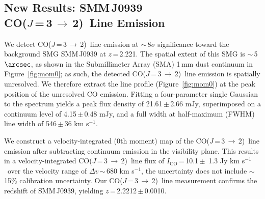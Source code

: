 \documentclass[twocolumn,apj,numberedappendix]{emulateapj}
\newcommand{\CO}{\mbox{CO($J$\,=\,3\,$\rightarrow$\,2) }}
\newcommand{\pmOne}{\mbox{$^{-1}$}}
\begin{document}
\subsection{New Results: SMM\,J0939\\ \CO Line Emission}
We detect \CO line emission at $\sim$\,8$\sigma$ significance toward the background SMG SMM\,J0939 at $z$\,=\,2.221.
The spatial extent of this SMG is $\sim$\,5$\arcsec$, as shown in the Submillimeter Array (SMA) 1\,mm dust continuum in Figure~\ref{fig:mom0}; as such, 
the detected \CO line emission is spatially unresolved. We therefore extract the line profile (Figure~\ref{fig:mom0}) at the peak position of the unresolved 
CO emission. Fitting a four-parameter single Gaussian to the spectrum yields a peak flux density of 21.61\,$\pm$\,2.66\,\,mJy, superimposed on a 
continuum level of 4.15\,$\pm$\,0.48\,\,mJy, and a full width at half-maximum (FWHM) line width of 546\,$\pm$\,36\,\,km\,\,s\pmOne.  \par
We construct a velocity-integrated (0th moment) map of the \CO line 
emission after subtracting continuum emission in the visibility plane. This results in a velocity-integrated \CO line flux of $I_\textrm{CO}$\,=\,10.1\,$\pm$
\,1.3 Jy km\,\,s\pmOne\ over the velocity range of $\Delta v$\,$\sim$\,680 km\,\,s\pmOne, the uncertainty does not include $\sim$\,15\% calibration 
uncertainty. Our \CO line measurement confirms the redshift of SMM\,J0939, yielding $z$\,=\,2.2212\,$\pm$\,0.0010.
\end{document}
